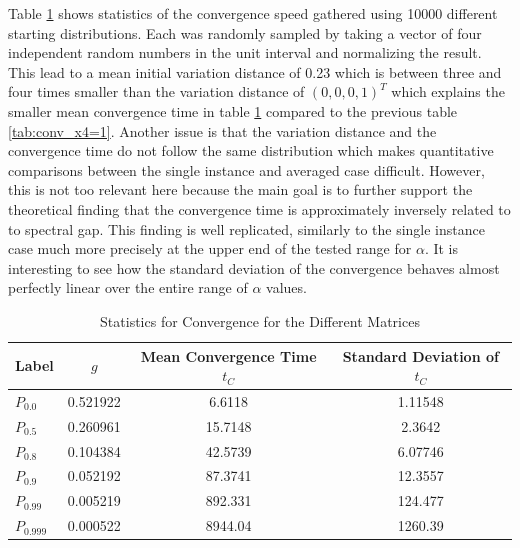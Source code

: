 Table \ref{tab:conv_stats} shows statistics of the convergence speed gathered using 10000 different starting distributions.
Each was randomly sampled by taking a vector of four independent random numbers in the unit interval and normalizing the result.
This lead to a mean initial variation distance of \num{0.23} which is between three and four times smaller than the variation distance of $(0, 0, 0, 1)^T$ which explains the smaller mean convergence time in table \ref{tab:conv_stats} compared to the previous table \ref{tab:conv_x4=1}.
Another issue is that the variation distance and the convergence time do not follow the same distribution which makes quantitative comparisons between the single instance and averaged case difficult.
However, this is not too relevant here because the main goal is to further support the theoretical finding that the convergence time is approximately inversely related to to spectral gap.
This finding is well replicated, similarly to the single instance case much more precisely at the upper end of the tested range for $\alpha$.
It is interesting to see how the standard deviation of the convergence behaves almost perfectly linear over the entire range of $\alpha$ values.  
\begin{table}[h]
	\centering
	\begin{tabular}{lccc}
		\hline
		Label &$g$ &  Mean Convergence Time $t_C$ & Standard Deviation of $t_C$ \\
		\hline
		$P_{0.0}$ &0.521922 &  6.6118 & 1.11548 \\
		$P_{0.5}$ &0.260961 & 15.7148 & 2.3642 \\
		$P_{0.8}$ &0.104384 & 42.5739 & 6.07746 \\
		$P_{0.9}$ &0.052192 & 87.3741 & 12.3557 \\
		$P_{0.99}$ &0.005219 & 892.331 & 124.477 \\
		$P_{0.999}$ &0.000522 & 8944.04 & 1260.39 \\
		\hline
	\end{tabular}
	\caption{Statistics for Convergence for the Different Matrices}
	\label{tab:conv_stats}
\end{table}
